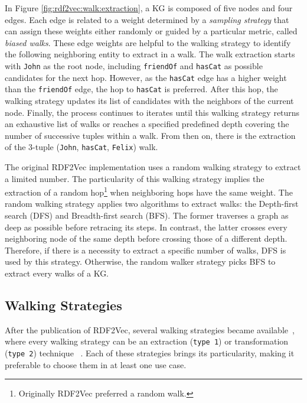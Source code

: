 In Figure \ref{fig:rdf2vec:walk:extraction}, a KG is composed of five nodes and
four edges. Each edge is related to a weight determined by a \emph{sampling
strategy} that can assign these weights either randomly or guided by a
particular metric, called \emph{biased walks}. These edge weights are helpful to
the walking strategy to identify the following neighboring entity to extract
in a walk. The walk extraction starts with \texttt{John} as the root node,
including \texttt{friendOf} and \texttt{hasCat} as possible candidates for the
next hop. However, as the \texttt{hasCat} edge has a higher weight than the
\texttt{friendOf} edge, the hop to \texttt{hasCat} is preferred. After this hop,
the walking strategy updates its list of candidates with the neighbors of the
current node. Finally, the process continues to iterates until this walking
strategy returns an exhaustive list of walks or reaches a specified predefined
depth covering the number of successive tuples within a walk. From then on,
there is the extraction of the 3-tuple (\texttt{John}, \texttt{hasCat},
\texttt{Felix}) walk.

The original RDF2Vec implementation uses a random walking strategy to extract a
limited number. The particularity of this walking strategy implies the
extraction of a random hop\footnote{Originally RDF2Vec preferred a random walk.}
when neighboring hops have the same weight. The random walking strategy applies
two algorithms to extract walks: the Depth-first search (DFS) and Breadth-first
search (BFS). The former traverses a graph as deep as possible before retracing
its steps. In contrast, the latter crosses every neighboring node of the same
depth before crossing those of a different depth. Therefore, if there is a
necessity to extract a specific number of walks, DFS is used by this
strategy. Otherwise, the random walker strategy picks BFS to extract every walks
of a KG.

\subsection{Walking Strategies}
\label{subsec:rdf2vec::walking:strategies}

After the publication of RDF2Vec, several walking strategies became
available~\citep{inproceedings:cochez}, where every walking strategy can be an
extraction (\texttt{type 1}) or transformation (\texttt{type 2}) technique
~\citep{article:vandewiele}. Each of these strategies brings its particularity,
making it preferable to choose them in at least one use case.

